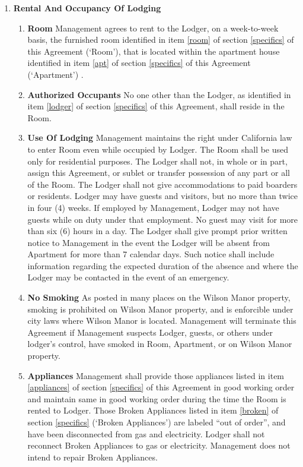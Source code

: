 \documentclass[12pt,letterpaper]{article}
\newcommand{\management}{Management}
\newcommand{\condo}{Wilson Manor}
\newcommand{\apt}{Apartment}
\newcommand{\room}{Room}
\newcommand{\broken}{Broken Appliances}
\newcommand{\lodger}{Lodger}
\begin{document}
\begin{enumerate}
	\item \textbf{Rental And Occupancy Of Lodging} \quad 
		\begin{enumerate}
			\item \textbf{Room} \quad
				\management{} agrees to rent to the \lodger{}, on a week-to-week basis, the furnished room identified in item \ref{room} of section \ref{specifics} of this Agreement (`\room{}'), that is located within the apartment house identified in item \ref{apt} of section \ref{specifics} of this Agreement{} (`\apt{}') . 
			\item \textbf{Authorized Occupants} \quad No one other than the \lodger{}, as identified in item \ref{lodger} of section \ref{specifics} of this Agreement{}, shall reside in the \room{}. 
			\item \textbf{Use Of Lodging} \quad \management{} maintains the right under California law to enter \room{} even while occupied by \lodger{}. The \room{} shall be used only for residential purposes. The \lodger{} shall not, in whole or in part, assign this Agreement, or sublet or transfer possession of any part or all of the \room{}. The \lodger{} shall not give accommodations to paid boarders or residents. \lodger{} may have guests and visitors, but no more than twice in four (4) weeks. If employed by \management{}, \lodger{} may not have guests while on duty under that employment. No guest may visit for more than six (6) hours in a day. The \lodger{} shall give prompt prior written notice to \management{} in the event the \lodger{} will be absent from \apt{} for more than 7 calendar days. Such notice shall include information regarding the expected duration of the absence and where the \lodger{} may be contacted in the event of an emergency. 
			\item \textbf{No Smoking} \quad As posted in many places on the \condo{} property, smoking is prohibited on \condo{} property, and is enforcible under city laws where \condo{} is located. \management{} will terminate this Agreement if \management{} suspects \lodger{}, guests, or others under lodger's control, have smoked in \room{}, \apt{}, or on \condo{} property.
			\item \textbf{Appliances} \quad \management{} shall provide those appliances listed in item \ref{appliances} of section \ref{specifics} of this Agreement{} in good working order and maintain same in good working order during the time the \room{} is rented to \lodger{}. Those \broken{} listed in item \ref{broken} of section \ref{specifics} (`\broken') are labeled ``out of order'', and have been disconnected from gas and electricity. \lodger{} shall not reconnect \broken{} to gas or electricity. \management{} does not intend to repair \broken{}.

\end{enumerate}
\end{enumerate}
\end{document}
